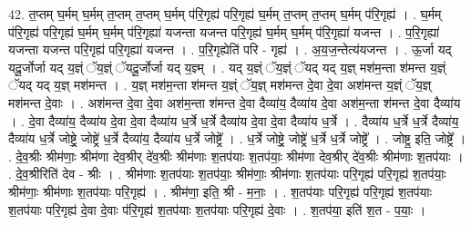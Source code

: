 \documentclass[17pt]{extarticle}
\begin{document}
42. त॒प्तम् घ॒र्मम् घ॒र्मम् त॒प्तम् त॒प्तम् घ॒र्मम् प॑रि॒गृह्य॑ परि॒गृह्य॑ घ॒र्मम् त॒प्तम् त॒प्तम् घ॒र्मम् प॑रि॒गृह्य॑ । . घ॒र्मम् प॑रि॒गृह्य॑ परि॒गृह्य॑ घ॒र्मम् घ॒र्मम् प॑रि॒गृह्या॑ यजन्ता यजन्त परि॒गृह्य॑ घ॒र्मम् घ॒र्मम् प॑रि॒गृह्या॑ यजन्त । . प॒रि॒गृह्या॑ यजन्ता यजन्त परि॒गृह्य॑ परि॒गृह्या॑ यजन्त । . प॒रि॒गृह्येति॑ परि - गृह्य॑ । . अ॒य॒ज॒न्तेत्य॑यजन्त । . ऊ॒र्जा यद् यदू॒र्जोर्जा यद् य॒ज्ञ्ं ॅय॒ज्ञ्ं ॅयदू॒र्जोर्जा यद् य॒ज्ञ्म् । . यद् य॒ज्ञ्ं ॅय॒ज्ञ्ं ॅयद् यद् य॒ज्ञ् मश॑म॒न्ता श॑मन्त य॒ज्ञ्ं ॅयद् यद् य॒ज्ञ् मश॑मन्त । . य॒ज्ञ् मश॑म॒न्ता श॑मन्त य॒ज्ञ्ं ॅय॒ज्ञ् मश॑मन्त दे॒वा दे॒वा अश॑मन्त य॒ज्ञ्ं ॅय॒ज्ञ् मश॑मन्त दे॒वाः । . अश॑मन्त दे॒वा दे॒वा अश॑म॒न्ता श॑मन्त दे॒वा दैव्या॑य॒ दैव्या॑य दे॒वा अश॑म॒न्ता श॑मन्त दे॒वा दैव्या॑य । . दे॒वा दैव्या॑य॒ दैव्या॑य दे॒वा दे॒वा दैव्या॑य ध॒र्त्रे ध॒र्त्रे दैव्या॑य दे॒वा दे॒वा दैव्या॑य ध॒र्त्रे । . दैव्या॑य ध॒र्त्रे ध॒र्त्रे दैव्या॑य॒ दैव्या॑य ध॒र्त्रे जोष्ट्रे॒ जोष्ट्रे॑ ध॒र्त्रे दैव्या॑य॒ दैव्या॑य ध॒र्त्रे जोष्ट्रे᳚ । . ध॒र्त्रे जोष्ट्रे॒ जोष्ट्रे॑ ध॒र्त्रे ध॒र्त्रे जोष्ट्रे᳚ । . जोष्ट्र॒ इति॒ जोष्ट्रे᳚ । . दे॒व॒श्रीः श्रीम॑णाः॒ श्रीम॑णा देव॒श्रीर् दे॑व॒श्रीः श्रीम॑णाः श॒तप॑याः श॒तप॑याः॒ श्रीम॑णा देव॒श्रीर् दे॑व॒श्रीः श्रीम॑णाः श॒तप॑याः । . दे॒व॒श्रीरिति॑ देव - श्रीः । . श्रीम॑णाः श॒तप॑याः श॒तप॑याः॒ श्रीम॑णाः॒ श्रीम॑णाः श॒तप॑याः परि॒गृह्य॑ परि॒गृह्य॑ श॒तप॑याः॒ श्रीम॑णाः॒ श्रीम॑णाः श॒तप॑याः परि॒गृह्य॑ । . श्रीम॑णा॒ इति॒ श्री - म॒नाः॒ । . श॒तप॑याः परि॒गृह्य॑ परि॒गृह्य॑ श॒तप॑याः श॒तप॑याः परि॒गृह्य॑ दे॒वा दे॒वाः प॑रि॒गृह्य॑ श॒तप॑याः श॒तप॑याः परि॒गृह्य॑ दे॒वाः । . श॒तप॑या॒ इति॑ श॒त - प॒याः॒ । \newline
\pagebreak
{}
\end{document}
